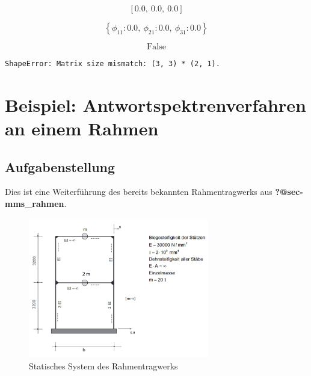 \documentclass[
  letterpaper,
  DIV=11]{scrreprt}
\begin{document}
\begin{equation*}\left[ 0.0, \  0.0, \  0.0\right]\end{equation*}

\begin{equation*}\left\{ \phi_{11} : 0.0, \  \phi_{21} : 0.0, \  \phi_{31} : 0.0\right\}\end{equation*}

\begin{equation*}\text{False}\end{equation*}

\begin{verbatim}
ShapeError: Matrix size mismatch: (3, 3) * (2, 1).
\end{verbatim}

\hypertarget{beispiel-antwortspektrenverfahren-an-einem-rahmen}{%
\chapter{Beispiel: Antwortspektrenverfahren an einem
Rahmen}\label{beispiel-antwortspektrenverfahren-an-einem-rahmen}}

\hypertarget{aufgabenstellung-13}{%
\section{Aufgabenstellung}\label{aufgabenstellung-13}}

Dies ist eine Weiterführung des bereits bekannten Rahmentragwerks aus
\textbf{?@sec-mms\_rahmen}.

\begin{figure}[H]

{\centering \includegraphics[width=0.7\textwidth,height=\textheight]{bilder/mms5.jpg}

}

\caption{\label{fig-system}Statisches System des Rahmentragwerks}

\end{figure}
\end{document}
